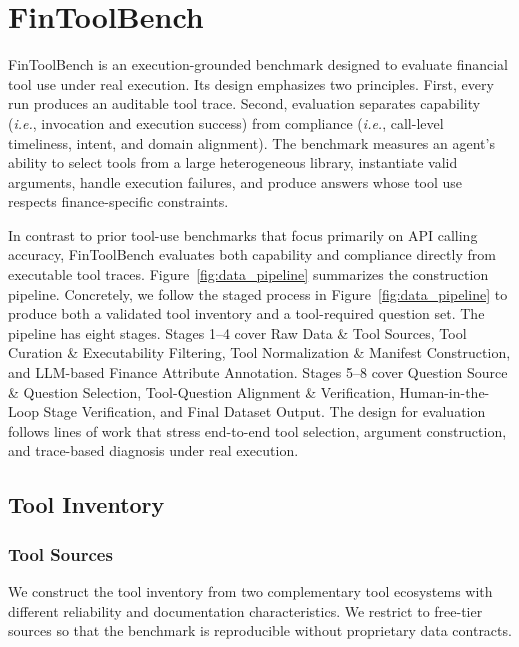 \documentclass[sigconf,nonacm]{acmart}
\begin{document}
\section{FinToolBench}
\label{sec:benchmark}

FinToolBench is an execution-grounded benchmark designed to evaluate financial tool use under real execution.
Its design emphasizes two principles.
First, every run produces an auditable tool trace.
Second, evaluation separates capability (\textit{i.e.}, invocation and execution success) from compliance (\textit{i.e.},  call-level timeliness, intent, and domain alignment).
The benchmark measures an agent's ability to select tools from a large heterogeneous library, instantiate valid arguments, handle execution failures, and produce answers whose tool use respects finance-specific constraints.

In contrast to prior tool-use benchmarks that focus primarily on API calling accuracy, FinToolBench evaluates both capability and compliance directly from executable tool traces.
Figure~\ref{fig:data_pipeline} summarizes the construction pipeline.
Concretely, we follow the staged process in Figure~\ref{fig:data_pipeline} to produce both a validated tool inventory and a tool-required question set.
The pipeline has eight stages.
Stages 1--4 cover Raw Data \& Tool Sources, Tool Curation \& Executability Filtering, Tool Normalization \& Manifest Construction, and LLM-based Finance Attribute Annotation.
Stages 5--8 cover Question Source \& Question Selection, Tool-Question Alignment \& Verification, Human-in-the-Loop Stage Verification, and Final Dataset Output.
The design for evaluation follows lines of work that stress end-to-end tool selection, argument construction, and trace-based diagnosis under real execution.

\subsection{Tool Inventory}
\label{subsec:tool_inventory}

\subsubsection{Tool Sources}
\label{subsec:tool_sources}

We construct the tool inventory from two complementary tool ecosystems with different reliability and documentation characteristics.
We restrict to free-tier sources so that the benchmark is reproducible without proprietary data contracts. 
\end{document}
